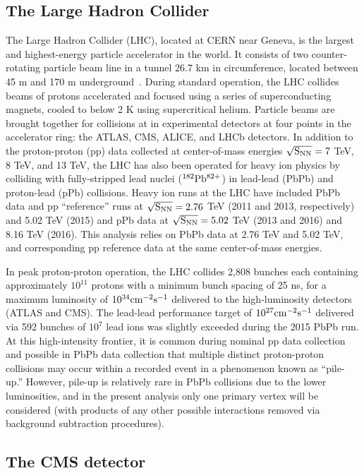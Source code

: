 
\subsection{The Large Hadron Collider}

The Large Hadron Collider (LHC), located at CERN near Geneva, is the largest and highest-energy particle accelerator in the world.  It consists of two counter-rotating particle beam line in a tunnel 26.7 km in circumference, located between 45 m and 170 m underground~\cite{Evans:2008zzb}.  During standard operation, the LHC collides beams of protons accelerated and focused using a series of superconducting magnets, cooled to below 2 K using supercritical helium.  Particle beams are brought together for collisions at in experimental detectors at four points in the accelerator ring:  the ATLAS, CMS, ALICE, and LHCb detectors.  In addition to the proton-proton (pp) data collected at center-of-mass energies $\sqrt{\rm S_{NN}} = 7$ TeV, 8 TeV, and 13 TeV, the LHC has also been operated for heavy ion physics by colliding with fully-stripped lead nuclei ($\rm ^{182}Pb^{82+}$) in lead-lead (PbPb) and proton-lead (pPb) collisions.  Heavy ion runs at the LHC have included PbPb data and pp ``reference'' runs at $\sqrt{\rm S_{NN}} = 2.76$ TeV (2011 and 2013, respectively) and 5.02 TeV (2015) and pPb data at $\sqrt{\rm S_{NN}} = 5.02$ TeV (2013 and 2016) and 8.16 TeV (2016).  This analysis relies on PbPb data at 2.76 TeV and 5.02 TeV, and corresponding pp reference data at the same center-of-mass energies. 

In peak proton-proton operation, the LHC collides 2,808 bunches each containing approximately $10^{11}$ protons with a minimum bunch spacing of 25 ns, for a maximum luminosity of $10^{34}\rm cm^{-2}s^{-1}$ delivered to the high-luminosity detectors (ATLAS and CMS).  The lead-lead performance target of $10^{27}\rm cm^{-2}s^{-1}$ delivered via 592 bunches of $10^{7}$ lead ions was slightly exceeded during the 2015 PbPb run.  At this high-intensity frontier, it is common during nominal pp data collection and possible in PbPb data collection that multiple distinct proton-proton collisions may occur within a recorded event in a phenomenon known as ``pile-up.''  However, pile-up is relatively rare in PbPb collisions due to the lower luminosities, and in the present analysis only one primary vertex will be considered (with products of any other possible interactions removed via background subtraction procedures). 

\subsection{The CMS detector}

